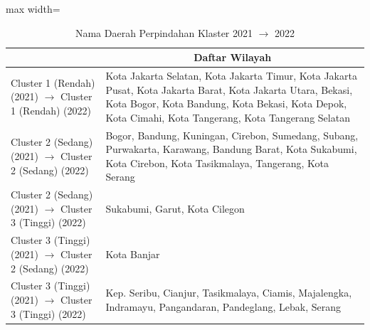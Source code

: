 \begin{table}[H]
\centering
\caption{Nama Daerah Perpindahan Klaster 2021 \(\rightarrow\) 2022} \label{tab:app2transname2021x2022}
\begin{adjustbox}{max width=\textwidth}
\begin{tabular}{|>{\centering\arraybackslash}p{4cm}|p{10cm}|}
\hline
\multicolumn{1}{|c|}{\textbf{Kategori}} & \multicolumn{1}{c|}{\textbf{Daftar Wilayah}} \\
\hline
Cluster 1 (Rendah) (2021) \(\rightarrow\) Cluster 1 (Rendah) (2022) & Kota Jakarta Selatan, Kota Jakarta Timur, Kota Jakarta Pusat, Kota Jakarta Barat, Kota Jakarta Utara, Bekasi, Kota Bogor, Kota Bandung, Kota Bekasi, Kota Depok, Kota Cimahi, Kota Tangerang, Kota Tangerang Selatan \\
\hline
Cluster 2 (Sedang) (2021) \(\rightarrow\) Cluster 2 (Sedang) (2022) & Bogor, Bandung, Kuningan, Cirebon, Sumedang, Subang, Purwakarta, Karawang, Bandung Barat, Kota Sukabumi, Kota Cirebon, Kota Tasikmalaya, Tangerang, Kota Serang \\
\hline
Cluster 2 (Sedang) (2021) \(\rightarrow\) Cluster 3 (Tinggi) (2022) & Sukabumi, Garut, Kota Cilegon \\
\hline
Cluster 3 (Tinggi) (2021) \(\rightarrow\) Cluster 2 (Sedang) (2022) & Kota Banjar \\
\hline
Cluster 3 (Tinggi) (2021) \(\rightarrow\) Cluster 3 (Tinggi) (2022) & Kep. Seribu, Cianjur, Tasikmalaya, Ciamis, Majalengka, Indramayu, Pangandaran, Pandeglang, Lebak, Serang \\
\hline
\end{tabular}
\end{adjustbox}
\end{table}